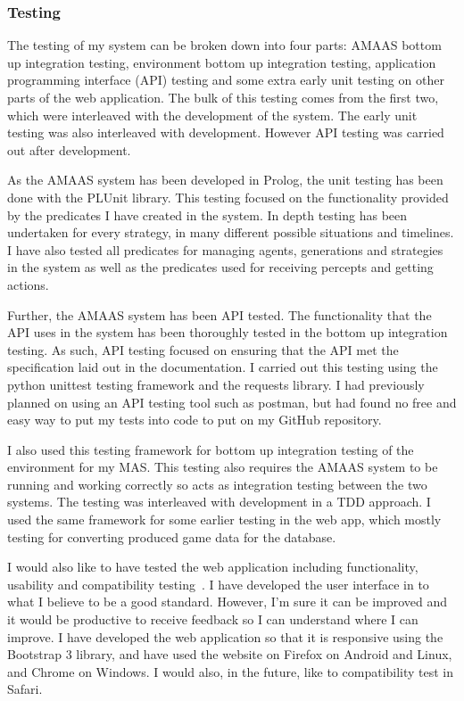 \documentclass[]{final_report}
\begin{document}
\subsubsection{Testing}
The testing of my system can be broken down into four parts: AMAAS bottom up integration testing, environment bottom up integration testing, application programming interface (API) testing and some extra early unit testing on other parts of the web application. The bulk of this testing comes from the first two, which were interleaved with the development of the system. The early unit testing was also interleaved with development. However API testing was carried out after development.\par 
As the AMAAS system has been developed in Prolog, the unit testing has been done with the PLUnit library. This testing focused on the functionality provided by the predicates I have created in the system. In depth testing has been undertaken for every strategy, in many different possible situations and timelines. I have also tested all predicates for managing agents, generations and strategies in the system as well as the predicates used for receiving percepts and getting actions.\par 
Further, the AMAAS system has been API tested. The functionality that the API uses in the system has been thoroughly tested in the bottom up integration testing. As such, API testing focused on ensuring that the API met the specification laid out in the documentation. I carried out this testing using the python unittest testing framework and the requests library. I had previously planned on using an API testing tool such as postman, but had found no free and easy way to put my tests into code to put on my GitHub repository.\par 
I also used this testing framework for bottom up integration testing of the environment for my MAS. This testing also requires the AMAAS system to be running and working correctly so acts as integration testing between the two systems. The testing was interleaved with development in a TDD approach. I used the same framework for some earlier testing in the web app, which mostly testing for converting produced game data for the database.\par 
I would also like to have tested the web application including functionality, usability and compatibility testing~\cite{guru99_testing, software_testing_help}. I have developed the user interface in to what I believe to be a good standard. However, I'm sure it can be improved and it would be productive to receive feedback so I can understand where I can improve. I have developed the web application so that it is responsive using the Bootstrap 3 library, and have used the website on Firefox on Android and Linux, and Chrome on Windows. I would also, in the future, like to compatibility test in Safari.
\end{document}
